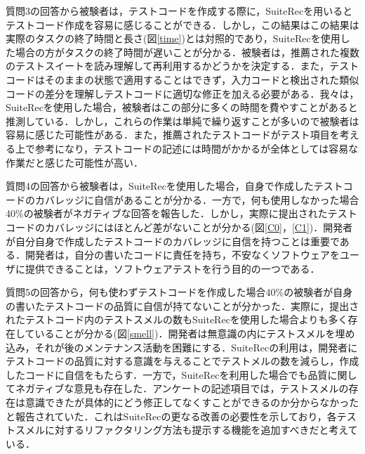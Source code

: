 \documentclass[12pt]{jarticle} %
\begin{document}
質問3の回答から被験者は，テストコードを作成する際に，{\sf SuiteRec}を用いるとテストコード作成を容易に感じることができる．しかし，この結果はこの結果は実際のタスクの終了時間と長さ(図\ref{time})とは対照的であり，{\sf SuiteRec}を使用した場合の方がタスクの終了時間が遅いことが分かる．被験者は，推薦された複数のテストスイートを読み理解して再利用するかどうかを決定する．また，テストコードはそのままの状態で適用することはできず，入力コードと検出された類似コードの差分を理解しテストコードに適切な修正を加える必要がある．我々は，{\sf SuiteRec}を使用した場合，被験者はこの部分に多くの時間を費やすことがあると推測している．しかし，これらの作業は単純で繰り返すことが多いので被験者は容易に感じた可能性がある．また，推薦されたテストコードがテスト項目を考える上で参考になり，テストコードの記述には時間がかかるが全体としては容易な作業だと感じた可能性が高い．

質問4の回答から被験者は，{\sf SuiteRec}を使用した場合，自身で作成したテストコードのカバレッジに自信があることが分かる．一方で，何も使用しなかった場合40\%の被験者がネガティブな回答を報告した．しかし，実際に提出されたテストコードのカバレッジにはほとんど差がないことが分かる(図\ref{C0}，\ref{C1})．開発者が自分自身で作成したテストコードのカバレッジに自信を持つことは重要である．開発者は，自分の書いたコードに責任を持ち，不安なくソフトウェアをユーザに提供できることは，ソフトウェアテストを行う目的の一つである．

質問5の回答から，何も使わずテストコードを作成した場合40\%の被験者が自身の書いたテストコードの品質に自信が持てないことが分かった．実際に，提出されたテストコード内のテストスメルの数も{\sf SuiteRec}を使用した場合よりも多く存在していることが分かる(図\ref{smell})．開発者は無意識の内にテストスメルを埋め込み，それが後のメンテナンス活動を困難にする．{\sf SuiteRec}の利用は，開発者にテストコードの品質に対する意識を与えることでテストメルの数を減らし，作成したコードに自信をもたらす．一方で，{\sf SuiteRec}を利用した場合でも品質に関してネガティブな意見も存在した．アンケートの記述項目では，テストスメルの存在は意識できたが具体的にどう修正してなくすことができるのか分からなかったと報告されていた．これは{\sf SuiteRec}の更なる改善の必要性を示しており，各テストスメルに対するリファクタリング方法も提示する機能を追加すべきだと考えている．
\end{document}
